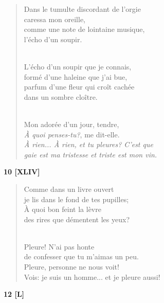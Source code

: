 \documentclass[a4paper,12pt]{book}
\begin{document}
\begin{verse}
Dans le tumulte discordant de l'orgie \\
caressa mon oreille, \\
comme une note de lointaine musique, \\
l'écho d'un soupir. \\ \

L'écho d'un soupir que je connais, \\
formé d'une haleine que j'ai bue, \\
parfum d'une fleur qui croît cachée \\
dans un sombre cloître. \\ \

Mon adorée d'un jour, tendre, \\
{\em À quoi penses-tu?\/}, me dit-elle. \\
{\em À rien... À rien, et tu pleures? C'est que \\
gaie est ma tristesse et triste est mon vin.} \\
\end{verse}


\begin{center} {\bf 10 [XLIV]}  \end{center}

\begin{verse}
Comme dans un livre ouvert \\
je lis dans le fond de tes pupilles; \\
À quoi bon feint la lèvre \\
des rires que démentent les yeux? \\ \

Pleure! N'ai pas honte \\
de confesser que tu m'aimas un peu. \\
Pleure, personne ne nous voit! \\
Vois: je suis un homme... et je pleure aussi! \\
\end{verse}

\bigskip

\begin{center} {\bf 12 [L]} \end{center}
\end{document}
